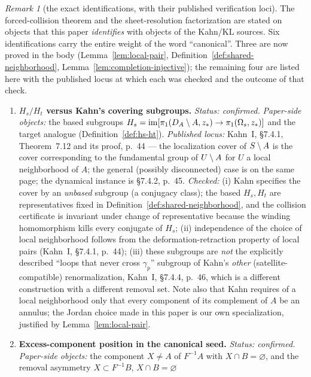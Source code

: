 \documentclass[11pt,reqno]{amsart}
\theoremstyle{definition}
\theoremstyle{remark}
\newtheorem{remark}[theorem]{Remark}
\begin{document}
\begin{remark}[the exact identifications, with their published verification loci]\label{rem:exact-identification-checklist}
The forced-collision theorem and the sheet-resolution factorization are
stated on objects that this paper \emph{identifies} with objects of
the Kahn/KL sources.  Six identifications carry the entire
weight of the word ``canonical''.  Three are now proved in the body
(Lemma~\ref{lem:local-pair},
Definition~\ref{def:shared-neighborhood},
Lemma~\ref{lem:completion-injective}); the remaining four are listed
here with the published locus at which each was checked and the
outcome of that check.
\begin{enumerate}
\item \textbf{\(H_s/H_t\) versus Kahn's covering subgroups.}
\emph{Status: confirmed.}
\emph{Paper-side objects:} the based subgroups
\(H_s=\operatorname{im}[\pi_1(D_A\setminus A,z_*)\to\pi_1(\Omega_s,z_*)]\)
and the target analogue (Definition~\ref{def:hs-ht}).
\emph{Published locus:} Kahn~I, \S7.4.1, Theorem~7.12 and its proof,
p.~44 --- the localization cover of \(S\setminus A\) is the cover
corresponding to the fundamental group of \(U\setminus A\) for \(U\) a local
neighborhood of \(A\); the general (possibly disconnected) case is on
the same page; the dynamical instance is \S7.4.2, p.~45.
\emph{Checked:} (i) Kahn specifies the cover by an \emph{unbased}
subgroup (a conjugacy class); the based \(H_s,H_t\) are representatives
fixed in Definition~\ref{def:shared-neighborhood}, and the collision
certificate is invariant under change of representative because the
winding homomorphism kills every conjugate of \(H_s\); (ii)
independence of the choice of local neighborhood follows from the
deformation-retraction property of local pairs (Kahn~I, \S7.4.1,
p.~44); (iii) these subgroups are \emph{not} the explicitly described
``loops that never cross \(\gamma_p\)'' subgroup of Kahn's
\emph{other} (satellite-compatible) renormalization, Kahn~I, \S7.4.4,
p.~46, which is a different construction with a different removal set.
Note also that Kahn requires of a local neighborhood only that every
component of its complement of \(A\) be an annulus; the Jordan choice
made in this paper is our own specialization, justified by
Lemma~\ref{lem:local-pair}.
\item \textbf{Excess-component position in the canonical seed.}
\emph{Status: confirmed.}
\emph{Paper-side objects:} the component \(X\ne A\) of \(F^{-1}A\)
with \(X\cap B=\varnothing\), and the removal asymmetry
\(X\subset F^{-1}B\), \(X\cap B=\varnothing\)

\end{enumerate}
\end{remark}
\end{document}
